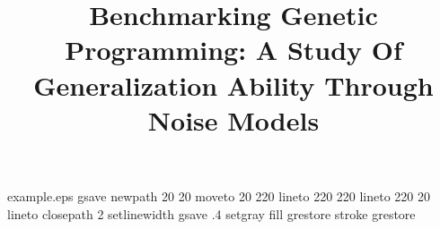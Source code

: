
%
%
%
%
%
\begin{filecontents*}{example.eps}
gsave
newpath
  20 20 moveto
  20 220 lineto
  220 220 lineto
  220 20 lineto
closepath
2 setlinewidth
gsave
  .4 setgray fill
grestore
stroke
grestore
\end{filecontents*}
%
\RequirePackage{fix-cm}
%
\documentclass[smallextended]{svjour3}       %
%
\smartqed  %
%
\usepackage{graphicx}
\usepackage{lscape}

%
%
%
%
%


\title{Benchmarking Genetic Programming: A Study Of Generalization Ability Through Noise Models
}


